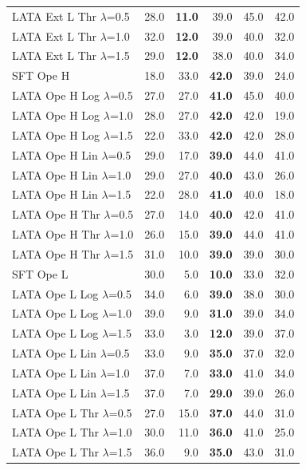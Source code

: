 \begin{longtable}{lrrrrr}
LATA Ext L Thr $\lambda$=0.5 & 28.0 & \textbf{11.0} & 39.0 & 45.0 & 42.0 \\
LATA Ext L Thr $\lambda$=1.0 & 32.0 & \textbf{12.0} & 39.0 & 40.0 & 32.0 \\
LATA Ext L Thr $\lambda$=1.5 & 29.0 & \textbf{12.0} & 38.0 & 40.0 & 34.0 \\
SFT Ope H & 18.0 & 33.0 & \textbf{42.0} & 39.0 & 24.0 \\
LATA Ope H Log $\lambda$=0.5 & 27.0 & 27.0 & \textbf{41.0} & 45.0 & 40.0 \\
LATA Ope H Log $\lambda$=1.0 & 28.0 & 27.0 & \textbf{42.0} & 42.0 & 19.0 \\
LATA Ope H Log $\lambda$=1.5 & 22.0 & 33.0 & \textbf{42.0} & 42.0 & 28.0 \\
LATA Ope H Lin $\lambda$=0.5 & 29.0 & 17.0 & \textbf{39.0} & 44.0 & 41.0 \\
LATA Ope H Lin $\lambda$=1.0 & 29.0 & 27.0 & \textbf{40.0} & 43.0 & 26.0 \\
LATA Ope H Lin $\lambda$=1.5 & 22.0 & 28.0 & \textbf{41.0} & 40.0 & 18.0 \\
LATA Ope H Thr $\lambda$=0.5 & 27.0 & 14.0 & \textbf{40.0} & 42.0 & 41.0 \\
LATA Ope H Thr $\lambda$=1.0 & 26.0 & 15.0 & \textbf{39.0} & 44.0 & 41.0 \\
LATA Ope H Thr $\lambda$=1.5 & 31.0 & 10.0 & \textbf{39.0} & 39.0 & 30.0 \\
SFT Ope L & 30.0 & 5.0 & \textbf{10.0} & 33.0 & 32.0 \\
LATA Ope L Log $\lambda$=0.5 & 34.0 & 6.0 & \textbf{39.0} & 38.0 & 30.0 \\
LATA Ope L Log $\lambda$=1.0 & 39.0 & 9.0 & \textbf{31.0} & 39.0 & 34.0 \\
LATA Ope L Log $\lambda$=1.5 & 33.0 & 3.0 & \textbf{12.0} & 39.0 & 37.0 \\
LATA Ope L Lin $\lambda$=0.5 & 33.0 & 9.0 & \textbf{35.0} & 37.0 & 32.0 \\
LATA Ope L Lin $\lambda$=1.0 & 37.0 & 7.0 & \textbf{33.0} & 41.0 & 34.0 \\
LATA Ope L Lin $\lambda$=1.5 & 37.0 & 7.0 & \textbf{29.0} & 39.0 & 26.0 \\
LATA Ope L Thr $\lambda$=0.5 & 27.0 & 15.0 & \textbf{37.0} & 44.0 & 31.0 \\
LATA Ope L Thr $\lambda$=1.0 & 30.0 & 11.0 & \textbf{36.0} & 41.0 & 25.0 \\
LATA Ope L Thr $\lambda$=1.5 & 36.0 & 9.0 & \textbf{35.0} & 43.0 & 31.0 \\

\end{longtable}
